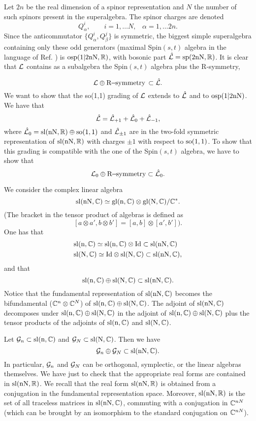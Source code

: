 \documentclass[a4paper,12pt]{article}
\begin{document}
Let $2n$ be the real dimension of a spinor representation and $N$
the number of such spinors present in the superalgebra. The spinor
charges are denoted $$Q^i_\alpha, \qquad i=1,\dots N,
\;\;\;\alpha=1,\dots 2n.$$ Since the anticommutator
$\{Q^i_\alpha,Q^j_\beta\}$ is symmetric, the biggest simple
superalgebra containing only these odd generators (maximal
Spin$(s,t)$ algebra in the language of Ref. \cite{dflv}) is
$\rm{osp}(1|2nN, \mathbb{R})$, with  bosonic part
$\hat{\mathcal{L}}=\rm{sp}(2nN,\mathbb{R})$. It is clear that $\mathcal{L}$ contains as a
subalgebra the Spin$(s,t)$ algebra plus the R-symmetry,

$$ \mathcal{L} \oplus \rm{R}\!\!-\!\!\rm{symmetry}\,\subset \hat{\mathcal{L}}.$$
 We
want to show that the so(1,1) grading of $\mathcal{L}$  extends to
$\hat{\mathcal{L}}$ and to $\rm{osp}(1|2nN)$.  We have that $$
\hat{\mathcal{L}}=\hat{\mathcal{L}}_{+1}+\hat{\mathcal{L}}_0+\hat{\mathcal{L}}_{-1},$$ where
$\hat{\mathcal{L}}_0=\rm{sl}(nN,\mathbb{R})\oplus \rm{so}(1,1)$ and $\hat{\mathcal{L}}_{\pm1}$
are in the two-fold symmetric representation of $\rm{sl}(nN,\mathbb{R})$
with charges $\pm1$ with respect to $\rm{so}(1,1)$. To show that
this grading is compatible with the one of the  Spin$(s,t)$
algebra, we have to show that $$ \mathcal{L}_0 \oplus
\rm{R}\!\!-\!\!\rm{symmetry}\subset \hat{\mathcal{L}}_0.$$

We consider the complex linear algebra
$$\rm{sl}(nN,\mathbb{C})\simeq\rm{gl}(n,\mathbb{C})\otimes\rm{gl}(N,\mathbb{C})/\mathbb{C}^*.$$
(The bracket in the tensor product of algebras is defined as
$$[a\otimes a',b\otimes b']=[a,b]\otimes[a',b']).$$ One has that
\begin{eqnarray*}&\rm{sl}(n,\mathbb{C})\simeq\rm{sl}(n,\mathbb{C})\otimes
\rm{Id}\subset\rm{sl}(nN,\mathbb{C})\\ & \rm{sl}(N,\mathbb{C})\simeq
\rm{Id}\otimes\rm{sl}(N,\mathbb{C})\subset\rm{sl}(nN,\mathbb{C}),\end{eqnarray*}
and that
$$\rm{sl}(n,\mathbb{C})\oplus\rm{sl}(N,\mathbb{C})\subset\rm{sl}(nN,\mathbb{C}).$$ Notice
that the fundamental representation of $\rm{sl}(nN,\mathbb{C})$ becomes
the bifundamental ($\mathbb{C}^n\otimes\mathbb{C}^N$) of
$\rm{sl}(n,\mathbb{C})\oplus\rm{sl}(N,\mathbb{C})$. The adjoint of
$\rm{sl}(nN,\mathbb{C})$ decomposes under
$\rm{sl}(n,\mathbb{C})\oplus\rm{sl}(N,\mathbb{C})$ in the adjoint of
$\rm{sl}(n,\mathbb{C})\oplus\rm{sl}(N,\mathbb{C})$ plus the tensor products of the
adjoints of  $\rm{sl}(n,\mathbb{C})$ and  $\rm{sl}(N,\mathbb{C})$.

Let $\mathcal{G}_n\subset\rm{sl}(n,\mathbb{C})$ and $\mathcal{G}_N\subset\rm{sl}(N,\mathbb{C})$.
Then we have $$\mathcal{G}_n\oplus \mathcal{G}_N\subset \rm{sl}(nN,\mathbb{C}).$$ In
particular, $\mathcal{G}_n$ and $\mathcal{G}_N$ can be orthogonal, symplectic, or
the linear algebras themselves. We have just to check that the
appropriate real forms are contained in $\rm{sl}(nN,\mathbb{R})$. We
recall that the real form $\rm{sl}(nN,\mathbb{R})$ is obtained from a
conjugation in the fundamental representation space. Moreover,
$\rm{sl}(nN,\mathbb{R})$ is the set of all traceless matrices in
$\rm{sl}(nN,\mathbb{C})$, commuting with a conjugation in $\mathbb{C}^{nN}$ (which
can be brought by an isomorphism to the standard conjugation on
$\mathbb{C}^{nN}$).
\end{document}
